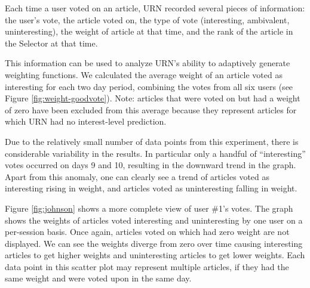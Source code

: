 Each time a user voted on an article, URN recorded several pieces of
information: the user's vote, the article voted on, the type of vote
(interesting, ambivalent, uninteresting), the weight of article at that time,
and the rank of the article in the Selector at that time.

This information can be used to analyze URN's ability to adaptively generate
weighting functions. We calculated the average weight of an article voted as
interesting for each two day period, combining the votes from all six users
(see Figure \ref{fig:weight-goodvote}). Note: articles that were voted on but
had a weight of zero have been excluded from this average because they
represent articles for which URN had no interest-level prediction.

\begin{figure*}[t]
  {\centerline{}}
  \caption{
  {\em Weight of an article voted as interesting averaged over all
  users vs. time.  This graph combines together approximately 330 votes.}}
  \label{fig:weight-goodvote}
\end{figure*}

Due to the relatively small number of data points from this experiment,
there is considerable variability in the results. In particular only a
handful of ``interesting'' votes occurred on days 9 and 10, resulting in
the downward trend in the graph. Apart from this anomaly, one can clearly
see a trend of articles voted as interesting rising in weight, and
articles voted as uninteresting falling in weight.

Figure \ref{fig:johnson} shows a more complete view of user \#1's votes. The
graph shows the weights of articles voted interesting and uninteresting by one
user on a per-session basis. Once again, articles voted on which had zero
weight are not displayed. We can see the weights diverge from zero over time
causing interesting articles to get higher weights and uninteresting articles
to get lower weights. Each data point in this scatter plot may represent
multiple articles, if they had the same weight and were voted upon in the same
day.

